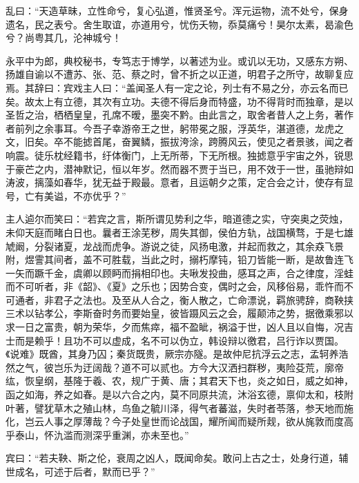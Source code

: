 \documentclass[12pt,UTF8]{ctexbook}
\begin{document}
乱曰：“天造草昧，立性命兮，复心弘道，惟贤圣兮。浑元运物，流不处兮，保身遗名，民之表兮。舍生取谊，亦道用兮，忧伤夭物，忝莫痛兮！昊尔太素，曷渝色兮？尚粤其几，沦神城兮！



永平中为郎，典校秘书，专笃志于博学，以著述为业。或讥以无功，又感东方朔、扬雄自谕以不遭苏、张、范、蔡之时，曾不折之以正道，明君子之所守，故聊复应焉。其辞曰：宾戏主人曰：“盖闻圣人有一定之论，列士有不易之分，亦云名而已矣。故太上有立德，其次有立功。夫德不得后身而特盛，功不得背时而独章，是以圣哲之治，栖栖皇皇，孔席不暧，墨突不黔。由此言之，取舍者昔人之上务，著作者前列之余事耳。今吾子幸游帝王之世，躬带冕之服，浮英华，湛道德，龙虎之文，旧矣。卒不能摅首尾，奋翼鳞，振拔洿涂，跨腾风云，使见之者景骇，闻之者响震。徒乐枕经籍书，纡体衡门，上无所蒂，下无所根。独摅意乎宇宙之外，锐思于豪芒之内，潜神默记，恒以年岁。然而器不贾于当已，用不效于一世，虽驰辩如涛波，摛藻如春华，犹无益于殿最。意者，且运朝夕之策，定合会之计，使存有显号，亡有美谥，不亦优乎？”



主人逌尔而笑曰：“若宾之言，斯所谓见势利之华，暗道德之实，守突奥之荧烛，未仰天庭而睹白日也。曩者王涂芜秽，周失其御，侯伯方轨，战国横骛，于是七雄虓阚，分裂诸夏，龙战而虎争。游说之徒，风扬电激，并起而救之，其余猋飞景附，煜霅其间者，盖不可胜载，当此之时，搦朽摩钝，铅刀皆能一断，是故鲁连飞一矢而蹶千金，虞卿以顾眄而捐相印也。夫啾发投曲，感耳之声，合之律度，淫蛙而不可听者，非《韶》、《夏》之乐也；因势合变，偶时之会，风移俗易，乖忤而不可通者，非君子之法也。及至从人合之，衡人散之，亡命漂说，羁旅骋辞，商鞅挟三术以钻孝公，李斯奋时务而要始皇，彼皆蹑风云之会，履颠沛之势，据徼乘邪以求一日之富贵，朝为荣华，夕而焦瘁，福不盈眦，祸溢于世，凶人且以自悔，况吉士而是赖乎！且功不可以虚成，名不可以伪立，韩设辩以徼君，吕行诈以贾国。《说难》既酋，其身乃囚；秦货既贵，厥宗亦隧。是故仲尼抗浮云之志，孟轲养浩然之气，彼岂乐为迂阔哉？道不可以贰也。方今大汉洒扫群秽，夷险芟荒，廓帝纮，恢皇纲，基隆于羲、农，规广于黄、唐；其君天下也，炎之如日，威之如神，函之如海，养之如春。是以六合之内，莫不同原共流，沐浴玄德，禀仰太和，枝附叶著，譬犹草木之殖山林，鸟鱼之毓川泽，得气者蕃滋，失时者苓落，参天地而施化，岂云人事之厚薄哉？今子处皇世而论战国，耀所闻而疑所觌，欲从旄敦而度高乎泰山，怀氿滥而测深乎重渊，亦未至也。”



宾曰：“若夫鞅、斯之伦，衰周之凶人，既闻命矣。敢问上古之士，处身行道，辅世成名，可述于后者，默而已乎？”
\end{document}
